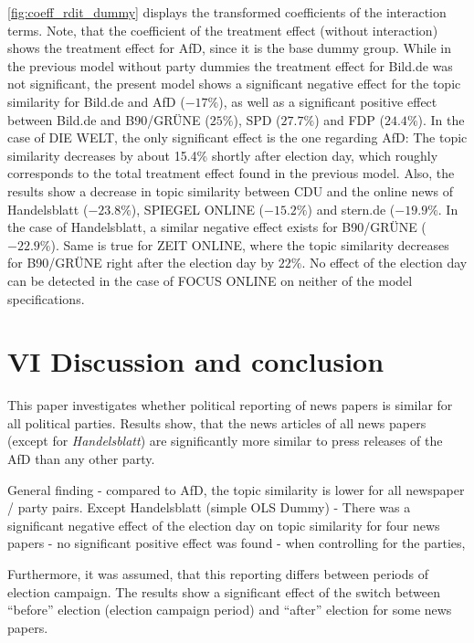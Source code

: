 \documentclass[
]{article}
\begin{document}
\autoref{fig:coeff_rdit_dummy} displays the transformed coefficients of
the interaction terms. Note, that the coefficient of the treatment
effect (without interaction) shows the treatment effect for AfD, since
it is the base dummy group. While in the previous model without party
dummies the treatment effect for Bild.de was not significant, the
present model shows a significant negative effect for the topic
similarity for Bild.de and AfD (\(-17\%\)), as well as a significant
positive effect between Bild.de and B90/GRÜNE (\(25\%\)), SPD
(\(27.7\%\)) and FDP (\(24.4\%\)). In the case of DIE WELT, the only
significant effect is the one regarding AfD: The topic similarity
decreases by about 15.4\% shortly after election day, which roughly
corresponds to the total treatment effect found in the previous model.
Also, the results show a decrease in topic similarity between CDU and
the online news of Handelsblatt (\(-23.8\%\)), SPIEGEL ONLINE
(\(-15.2\%\)) and stern.de (\(-19.9\%\). In the case of Handelsblatt, a
similar negative effect exists for B90/GRÜNE (\(-22.9\%\)). Same is true
for ZEIT ONLINE, where the topic similarity decreases for B90/GRÜNE
right after the election day by \(22\%\). No effect of the election day
can be detected in the case of FOCUS ONLINE on neither of the model
specifications.

\hypertarget{vi-discussion-and-conclusion}{%
\section{VI Discussion and
conclusion}\label{vi-discussion-and-conclusion}}

This paper investigates whether political reporting of news papers is
similar for all political parties. Results show, that the news articles
of all news papers (except for \emph{Handelsblatt}) are significantly
more similar to press releases of the AfD than any other party.

General finding - compared to AfD, the topic similarity is lower for all
newspaper / party pairs. Except Handelsblatt (simple OLS Dummy) - There
was a significant negative effect of the election day on topic
similarity for four news papers - no significant positive effect was
found - when controlling for the parties,

Furthermore, it was assumed, that this reporting differs between periods
of election campaign. The results show a significant effect of the
switch between ``before'' election (election campaign period) and
``after'' election for some news papers.
\end{document}
